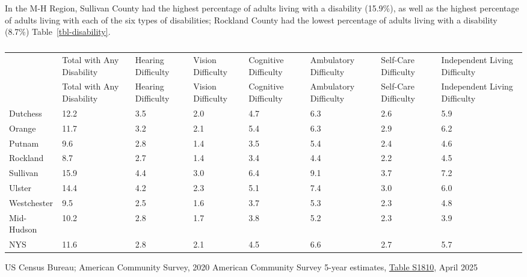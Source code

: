 \documentclass[
  english,
  letterpaper,
]{report}
\begin{document}
In the M-H Region, Sullivan County had the highest percentage of adults
living with a disability (15.9\%), as well as the highest percentage of
adults living with each of the six types of disabilities; Rockland
County had the lowest percentage of adults living with a disability
(8.7\%) Table~\ref{tbl-disability}.

\begin{longtable}[]{@{}llllllll@{}}

\caption{\label{tbl-disability}Percentage of Population by Type of
Disability, 2023}

\tabularnewline

\caption{}\label{T_05c86}\tabularnewline
\toprule\noalign{}
& Total with Any Disability & Hearing Difficulty & Vision Difficulty &
Cognitive Difficulty & Ambulatory Difficulty & Self-Care Difficulty &
Independent Living Difficulty \\
\midrule\noalign{}
\endfirsthead
\toprule\noalign{}
& Total with Any Disability & Hearing Difficulty & Vision Difficulty &
Cognitive Difficulty & Ambulatory Difficulty & Self-Care Difficulty &
Independent Living Difficulty \\
\midrule\noalign{}
\endhead
\bottomrule\noalign{}
\endlastfoot
Dutchess & 12.2 & 3.5 & 2.0 & 4.7 & 6.3 & 2.6 & 5.9 \\
Orange & 11.7 & 3.2 & 2.1 & 5.4 & 6.3 & 2.9 & 6.2 \\
Putnam & 9.6 & 2.8 & 1.4 & 3.5 & 5.4 & 2.4 & 4.6 \\
Rockland & 8.7 & 2.7 & 1.4 & 3.4 & 4.4 & 2.2 & 4.5 \\
Sullivan & 15.9 & 4.4 & 3.0 & 6.4 & 9.1 & 3.7 & 7.2 \\
Ulster & 14.4 & 4.2 & 2.3 & 5.1 & 7.4 & 3.0 & 6.0 \\
Westchester & 9.5 & 2.5 & 1.6 & 3.7 & 5.3 & 2.3 & 4.8 \\
Mid-Hudson & 10.2 & 2.8 & 1.7 & 3.8 & 5.2 & 2.3 & 3.9 \\
NYS & 11.6 & 2.8 & 2.1 & 4.5 & 6.6 & 2.7 & 5.7 \\

\end{longtable}

\begin{tcolorbox}[enhanced jigsaw, breakable, leftrule=.75mm, title=\textcolor{quarto-callout-note-color}{\faInfo}\hspace{0.5em}{Source}, bottomrule=.15mm, opacityback=0, left=2mm, colback=white, bottomtitle=1mm, coltitle=black, colbacktitle=quarto-callout-note-color!10!white, colframe=quarto-callout-note-color-frame, opacitybacktitle=0.6, toptitle=1mm, titlerule=0mm, arc=.35mm, rightrule=.15mm, toprule=.15mm]

US Census Bureau; American Community Survey, 2020 American Community
Survey 5-year estimates,
\href{https://data.census.gov/table?q=s1810&g=050XX00US36105,36027,36071,36119,36087,36079,36111_160XX00US3651000_040XX00US36}{Table
S1810}, April 2025

\end{tcolorbox}
\end{document}
